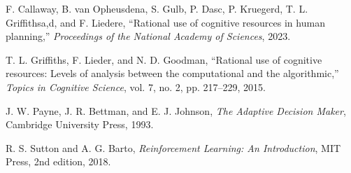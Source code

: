 \documentclass[a4paper,12pt,oneside,article]{memoir}
\begin{document}
\begin{thebibliography}{9}

F. Callaway, B. van Opheusdena, S. Gulb, P. Dasc, P. Kruegerd, T. L. Griffithsa,d, and F. Liedere,
\newblock ``Rational use of cognitive resources in human planning,''
\newblock \textit{Proceedings of the National Academy of Sciences}, 2023.

T. L. Griffiths, F. Lieder, and N. D. Goodman,
\newblock ``Rational use of cognitive resources: Levels of analysis between the computational and the algorithmic,''
\newblock \textit{Topics in Cognitive Science}, vol. 7, no. 2, pp. 217--229, 2015.

J. W. Payne, J. R. Bettman, and E. J. Johnson,
\newblock \textit{The Adaptive Decision Maker},
\newblock Cambridge University Press, 1993.

R. S. Sutton and A. G. Barto,
\newblock \textit{Reinforcement Learning: An Introduction},
\newblock MIT Press, 2nd edition, 2018.

\end{thebibliography}
\end{document}
